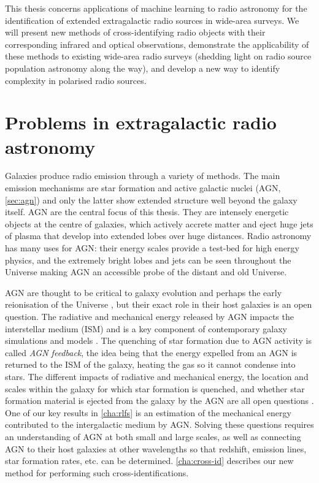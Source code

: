 \documentclass[11pt, a4paper]{book}
\newcommand{\defn}[1]{\emph{#1}}
\begin{document}
This thesis concerns applications of machine learning to radio astronomy for the identification of extended extragalactic radio sources in wide-area surveys. We will present new methods of cross-identifying radio objects with their corresponding infrared and optical observations, demonstrate the applicability of these methods to existing wide-area radio surveys (shedding light on radio source population astronomy along the way), and develop a new way to identify complexity in polarised radio sources.


\section{Problems in extragalactic radio astronomy}
\label{sec:problems-radio-astronomy}

    Galaxies produce radio emission through a variety of methods. The main emission mechanisms are star formation and active galactic nuclei (AGN, \autoref{sec:agn}) and only the latter show extended structure well beyond the galaxy itself. AGN are the central focus of this thesis. They are intensely energetic objects at the centre of galaxies, which actively accrete matter and eject huge jets of plasma that develop into extended lobes over huge distances. Radio astronomy has many uses for AGN: their energy scales provide a test-bed for high energy physics, and the extremely bright lobes and jets can be seen throughout the Universe making AGN an accessible probe of the distant and old Universe.

    AGN are thought to be critical to galaxy evolution and perhaps the early reionisation of the Universe \citep{bosch-ramon_role_2018}, but their exact role in their host galaxies is an open question. The radiative and mechanical energy released by AGN impacts the interstellar medium (ISM) and is a key component of contemporary galaxy simulations and models \citep{morganti_many_2017}. The quenching of star formation due to AGN activity is called \defn{AGN feedback}, the idea being that the energy expelled from an AGN is returned to the ISM of the galaxy, heating the gas so it cannot condense into stars. The different impacts of radiative and mechanical energy, the location and scales within the galaxy for which star formation is quenched, and whether star formation material is ejected from the galaxy by the AGN are all open questions \citep{husemann_reality_2018}. One of our key results in \autoref{cha:rlfs} is an estimation of the mechanical energy contributed to the intergalactic medium by AGN. Solving these questions requires an understanding of AGN at both small and large scales, as well as connecting AGN to their host galaxies at other wavelengths so that redshift, emission lines, star formation rates, etc. can be determined. \autoref{cha:cross-id} describes our new method for performing such cross-identifications.
\end{document}
